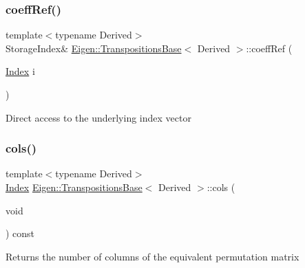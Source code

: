 \subsubsection{\texorpdfstring{coeffRef()}{coeffRef()}}
{\footnotesize\ttfamily template$<$typename Derived$>$ \\
Storage\+Index\& \mbox{\hyperlink{class_eigen_1_1_transpositions_base}{Eigen\+::\+Transpositions\+Base}}$<$ Derived $>$\+::coeff\+Ref (\begin{DoxyParamCaption}\item[{\mbox{\hyperlink{class_eigen_1_1_transpositions_base_a3f5f06118b419e8e6ccbe49ed5b4c91f}{Index}}}]{i }\end{DoxyParamCaption})\hspace{0.3cm}{\ttfamily [inline]}}

Direct access to the underlying index vector \mbox{\label{class_eigen_1_1_transpositions_base_acb6f58081640839bd4102b75bdeec562}} 
\subsubsection{\texorpdfstring{cols()}{cols()}}
{\footnotesize\ttfamily template$<$typename Derived$>$ \\
\mbox{\hyperlink{class_eigen_1_1_transpositions_base_a3f5f06118b419e8e6ccbe49ed5b4c91f}{Index}} \mbox{\hyperlink{class_eigen_1_1_transpositions_base}{Eigen\+::\+Transpositions\+Base}}$<$ Derived $>$\+::cols (\begin{DoxyParamCaption}\item[{void}]{ }\end{DoxyParamCaption}) const\hspace{0.3cm}{\ttfamily [inline]}}

\begin{DoxyReturn}{Returns}
the number of columns of the equivalent permutation matrix 
\end{DoxyReturn}
\mbox{\label{class_eigen_1_1_transpositions_base_a90acc796341b4627882705d1099e593d}} 
